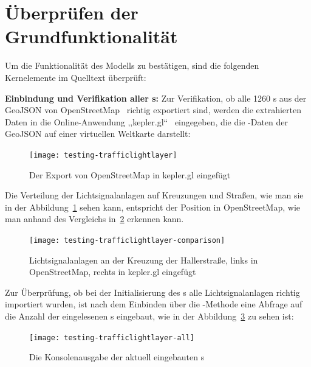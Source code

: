 %


\section{Überprüfen der Grundfunktionalität}\label{sec:testing}

Um die Funktionalität des Modells zu bestätigen, sind die folgenden Kernelemente im Quelltext überprüft:

\textbf{Einbindung und Verifikation aller s:} Zur Verifikation, ob alle 1260 s aus der GeoJSON von OpenStreetMap~\cite{OSF2004} richtig exportiert sind, werden die extrahierten Daten in die Online-Anwendung ,,kepler.gl``~\cite{Kepler2018} eingegeben, die die -Daten der GeoJSON auf einer virtuellen Weltkarte darstellt:

\begin{figure}[h]
    \centering
    \texttt{[image: testing-trafficlightlayer]}~\caption{Der Export von OpenStreetMap in kepler.gl eingefügt}
    \label{fig:traffic-light-spawns}
\end{figure}

Die Verteilung der Lichtsignalanlagen auf Kreuzungen und Straßen, wie man sie in der Abbildung~\ref{fig:traffic-light-spawns} sehen kann, entspricht der Position in OpenStreetMap, wie man anhand des Vergleichs in~\ref{fig:traffic-light-spawns-comparison} erkennen kann.

\begin{figure}[h]
    \centering
    \texttt{[image: testing-trafficlightlayer-comparison]}~\caption{Lichtsignalanlagen an der Kreuzung der Hallerstraße, links in OpenStreetMap, rechts in kepler.gl eingefügt}
    \label{fig:traffic-light-spawns-comparison}
\end{figure}

Zur Überprüfung, ob bei der Initialisierung des s alle Lichtsignalanlagen richtig importiert wurden, ist nach dem Einbinden über die -Methode eine Abfrage auf die Anzahl der eingelesenen s eingebaut, wie in der Abbildung~\ref{fig:all-traffic-lights} zu sehen ist:

\begin{figure}[h]
    \centering
    \texttt{[image: testing-trafficlightlayer-all]}~\caption{Die Konsolenausgabe der aktuell eingebauten s}
    \label{fig:all-traffic-lights}
\end{figure}

